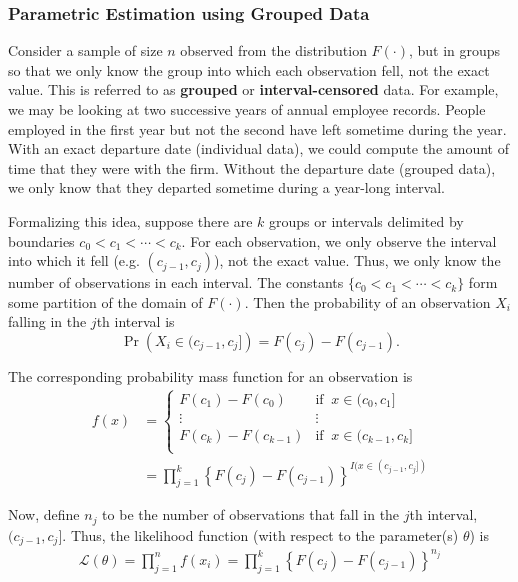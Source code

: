 \documentclass[]{book}
\theoremstyle{definition}
\theoremstyle{definition}
\theoremstyle{definition}
\theoremstyle{remark}
\begin{document}
\subsubsection{Parametric Estimation using Grouped
Data}\label{S:MS:GroupedData}

Consider a sample of size \(n\) observed from the distribution
\(F(\cdot)\), but in groups so that we only know the group into which
each observation fell, not the exact value. This is referred to as
\textbf{grouped} or \textbf{interval-censored} data. For example, we may
be looking at two successive years of annual employee records. People
employed in the first year but not the second have left sometime during
the year. With an exact departure date (individual data), we could
compute the amount of time that they were with the firm. Without the
departure date (grouped data), we only know that they departed sometime
during a year-long interval.

Formalizing this idea, suppose there are \(k\) groups or intervals
delimited by boundaries \(c_0 < c_1< \cdots < c_k\). For each
observation, we only observe the interval into which it fell (e.g.
\((c_{j-1}, c_j)\)), not the exact value. Thus, we only know the number
of observations in each interval. The constants
\(\{c_0 < c_1 < \cdots < c_k\}\) form some partition of the domain of
\(F(\cdot)\). Then the probability of an observation \(X_i\) falling in
the \(j\)th interval is \[\Pr\left(X
_i \in (c_{j-1}, c_j]\right) = F(c_j) - F(c_{j-1}).\]

The corresponding probability mass function for an observation is
\[\begin{aligned}
f(x) &=
\begin{cases}
F(c_1) - F(c_{0}) &   \text{if }\ x \in (c_{0}, c_1]\\
\vdots & \vdots \\
F(c_k) - F(c_{k-1}) &   \text{if }\ x \in (c_{k-1}, c_k]\\
\end{cases} \\
&= \prod_{j=1}^k \left\{F(c_j) - F(c_{j-1})\right\}^{I(x \in (c_{j-1}, c_j])}
\end{aligned}\]

Now, define \(n_j\) to be the number of observations that fall in the
\(j\)th interval, \((c_{j-1}, c_j]\). Thus, the likelihood function
(with respect to the parameter(s) \(\theta\)) is \[\begin{aligned}
\mathcal{L}(\theta) = \prod_{j=1}^n f(x_i) = \prod_{j=1}^k \left\{F(c_j) - F(c_{j-1})\right\}^{n_j}
\end{aligned}\]
\end{document}
